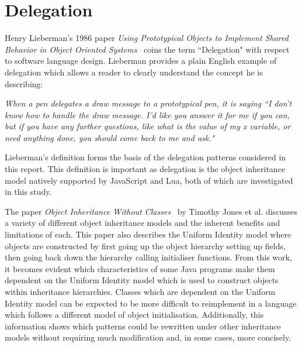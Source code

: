\section{Delegation}
\label{litDelegation}
Henry Lieberman's 1986 paper \textit{Using Prototypical Objects to Implement Shared Behavior in Object Oriented Systems}~\cite{UsingPrototypicalObjects} coins the term ``Delegation" with respect to software language design. Lieberman provides a plain English example of delegation which allows a reader to clearly understand the concept he is describing:
\begin{displayquote}\textit{
		When a pen delegates a draw message to a prototypical pen, it is saying ``I don't know how to handle the draw message. I'd like you answer it for me if you can, but if you have any further questions, like what is the value of my x variable, or need anything done, you should come back to me and ask."}~\cite{UsingPrototypicalObjects}
\end{displayquote}

Lieberman's definition forms the basis of the delegation patterns considered in this report. This definition is important as delegation is the object inheritance model natively supported by JavaScript and Lua, both of which are investigated in this study.
\newline

The paper \textit{Object Inheritance Without Classes}~\cite{InheritanceWithoutClasses} by Timothy Jones et al. discusses a variety of different object inheritance models and the inherent benefits and limitations of each. This paper also describes the Uniform Identity model where objects are constructed by first going up the object hierarchy setting up fields, then going back down the hierarchy calling initialiser functions. From this work, it becomes evident which characteristics of some Java programs make them dependent on the Uniform Identity model which is used to construct objects within inheritance hierarchies. Classes which are dependent on the Uniform Identity model can be expected to be more difficult to reimplement in a language which follows a different model of object initialisation. Additionally, this information shows which patterns could be rewritten under other inheritance models without requiring much modification and, in some cases, more concisely.

